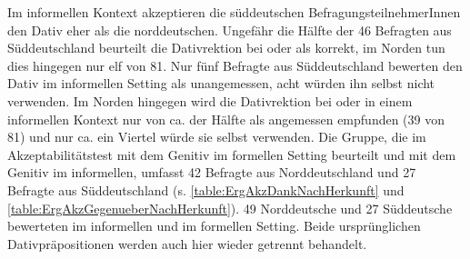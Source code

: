 Im informellen Kontext akzeptieren die süddeutschen BefragungsteilnehmerInnen den Dativ eher als die norddeutschen. 
Ungefähr die Hälfte der 46 Befragten aus Süddeutschland beurteilt die Dativrektion bei \wegen{} oder \waehrend{} als korrekt, im Norden tun dies hingegen nur elf von 81. 
Nur fünf Befragte aus Süddeutschland bewerten den Dativ im informellen Setting als unangemessen, acht würden ihn selbst nicht verwenden. 
Im Norden hingegen wird die Dativrektion bei \wegen{} oder \waehrend{} in einem informellen Kontext nur von ca. der Hälfte als angemessen empfunden (39 von 81) und nur ca. ein Viertel würde sie selbst verwenden. 
 Die Gruppe, die im Akzeptabilitätstest \dank{} mit dem Genitiv im formellen Setting beurteilt und \gegenueber{} mit dem Genitiv im informellen, umfasst 42 Befragte aus Norddeutschland und 27 Befragte aus Süddeutschland (s. \autoref{table:ErgAkzDankNachHerkunft} und \autoref{table:ErgAkzGegenueberNachHerkunft}).
49 Norddeutsche und 27 Süddeutsche bewerteten \dank{} im informellen und \gegenueber{} im formellen Setting. 
Beide ursprünglichen Dativpräpositionen werden auch hier wieder getrennt behandelt. 
